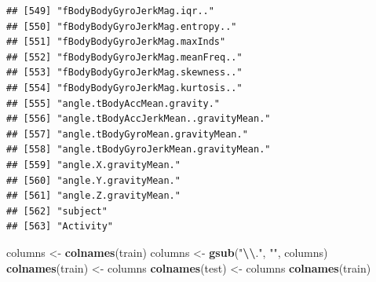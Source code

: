 \documentclass[
]{article}
\newenvironment{Shaded}{\begin{snugshade}}{\end{snugshade}}
\newcommand{\FunctionTok}[1]{\textcolor[rgb]{0.13,0.29,0.53}{\textbf{#1}}}
\newcommand{\NormalTok}[1]{#1}
\newcommand{\OtherTok}[1]{\textcolor[rgb]{0.56,0.35,0.01}{#1}}
\newcommand{\SpecialCharTok}[1]{\textcolor[rgb]{0.81,0.36,0.00}{\textbf{#1}}}
\newcommand{\StringTok}[1]{\textcolor[rgb]{0.31,0.60,0.02}{#1}}
\begin{document}
\begin{verbatim}
## [549] "fBodyBodyGyroJerkMag.iqr.."          
## [550] "fBodyBodyGyroJerkMag.entropy.."      
## [551] "fBodyBodyGyroJerkMag.maxInds"        
## [552] "fBodyBodyGyroJerkMag.meanFreq.."     
## [553] "fBodyBodyGyroJerkMag.skewness.."     
## [554] "fBodyBodyGyroJerkMag.kurtosis.."     
## [555] "angle.tBodyAccMean.gravity."         
## [556] "angle.tBodyAccJerkMean..gravityMean."
## [557] "angle.tBodyGyroMean.gravityMean."    
## [558] "angle.tBodyGyroJerkMean.gravityMean."
## [559] "angle.X.gravityMean."                
## [560] "angle.Y.gravityMean."                
## [561] "angle.Z.gravityMean."                
## [562] "subject"                             
## [563] "Activity"
\end{verbatim}

\begin{Shaded}
\begin{Highlighting}[]
\NormalTok{columns }\OtherTok{\textless{}{-}} \FunctionTok{colnames}\NormalTok{(train)}
\NormalTok{columns }\OtherTok{\textless{}{-}} \FunctionTok{gsub}\NormalTok{(}\StringTok{"}\SpecialCharTok{\textbackslash{}\textbackslash{}}\StringTok{."}\NormalTok{, }\StringTok{""}\NormalTok{, columns)}
\FunctionTok{colnames}\NormalTok{(train) }\OtherTok{\textless{}{-}}\NormalTok{ columns}
\FunctionTok{colnames}\NormalTok{(test) }\OtherTok{\textless{}{-}}\NormalTok{ columns}
\FunctionTok{colnames}\NormalTok{(train)}
\end{Highlighting}
\end{Shaded}
\end{document}
